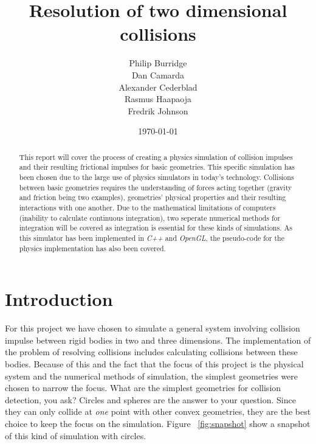 \documentclass[a4paper,12pt]{report}
\title{Resolution of two dimensional collisions}
\author{Philip Burridge\\
        Dan Camarda\\
        Alexander Cederblad\\
        Rasmus Haapaoja\\
        Fredrik Johnson}
\date{\today}
\begin{document}
\maketitle


\begin{abstract}
This report will cover the process of creating a physics simulation of collision impulses and their resulting frictional impulses for basic geometries. This specific simulation has been chosen due to the large use of physics simulators in today's technology. Collisions between basic geometries requires the understanding of forces acting together (gravity and friction being two examples), geometries' physical properties and their resulting interactions with one another. Due to the mathematical limitations of computers (inability to calculate continuous integration), two seperate numerical methods for integration will be covered as integration is essential for these kinds of simulations. As this simulator has been implemented in \emph{C++} and \emph{OpenGL}, the pseudo-code for the physics implementation has also been covered.
\end{abstract}


\tableofcontents
{}


\chapter{Introduction}
\setcounter{page}{1}

For this project we have chosen to simulate a general system involving collision impulse between rigid bodies in two and three dimensions. The implementation of the problem of resolving collisions includes calculating collisions between these bodies. Because of this and the fact that the focus of this project is the physical system and the numerical methods of simulation, the simplest geometries were chosen to narrow the focus. What are the simplest geometries for collision detection, you ask? Circles and spheres are the answer to your question. Since they can only collide at \emph{one} point with other convex geometries, they are the best choice to keep the focus on the simulation. Figure ~\ref{fig:snapshot} show a snapshot of this kind of simulation with circles.
\end{document}
